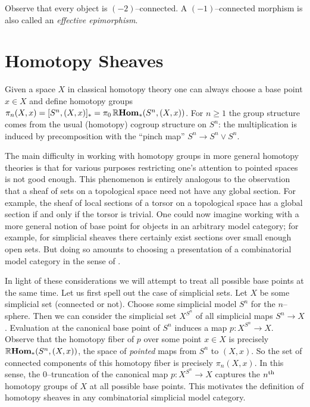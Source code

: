 Observe that every object is \((-2)\)--connected. A \((-1)\)--connected morphism
is also called an \emph{effective epimorphism}.

\section{Homotopy Sheaves}

Given a space \(X\) in classical homotopy theory one can always choose a base
point \(x\in X\) and define homotopy groups \(\pi_{n}(X,x) = [S^{n}, (X,x)]_{*}
= \pi_{0}\operatorname{\mathbb{R}\textnormal{\bfseries Hom}}_{*}(S^{n}, (X,x))\). For \(n\geq 1\) the group structure comes
from the usual (homotopy) cogroup structure on \(S^{n}\): the multiplication is
induced by precomposition with the \enquote{pinch map} \(S^{n}\to S^{n}\vee
S^{n}\).

The main difficulty in working with homotopy groups in more general homotopy
theories is that for various purposes restricting one's attention to pointed
spaces is not good enough. This phenomenon is entirely analogous to the
observation that a sheaf of sets on a topological space need not have any global
section. For example, the sheaf of local sections of a torsor on a topological
space has a global section if and only if the torsor is trivial. One could now
imagine working with a more general notion of base point for objects in an
arbitrary model category; for example, for simplicial sheaves there certainly
exist sections over small enough open sets. But doing so amounts to choosing a
presentation of a combinatorial model category in the sense of \cite{mr1870516}.

In light of these considerations we will attempt to treat all possible base
points at the same time. Let us first spell out the case of simplicial sets. Let
\(X\) be some simplicial set (connected or not). Choose some simplicial model
\(S^{n}\) for the \(n\)--sphere. Then we can consider the simplicial set
\(X^{S^{n}}\) of all simplicial maps \(S^{n}\to X\). Evaluation at the canonical
base point of \(S^{n}\) induces a map \(p\colon X^{S^{n}}\to X\). Observe that
the homotopy fiber of \(p\) over some point \(x\in X\) is precisely
\(\operatorname{\mathbb{R}\textnormal{\bfseries Hom}}_{*}(S^{n}, (X,x))\), the space of \emph{pointed} maps from \(S^{n}\) to
\((X,x)\). So the set of connected components of this homotopy fiber is
precisely \(\pi_{n}(X,x)\). In this sense, the \(0\)--truncation of the
canonical map \(p\colon X^{S^{n}}\to X\) captures the \(n\textsuperscript{th}\)
homotopy groups of \(X\) at all possible base points. This motivates the
definition of homotopy sheaves in any combinatorial simplicial model category.

